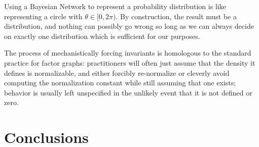 \documentclass{article}
\begin{document}
\begin{vfull}
		Using a Bayesian Network to represent a probability distribution is like representing a circle with $\theta \in [0, 2\pi)$. 
		By construction, the result must be a distribution, and nothing can possibly go wrong so long as we can always decide on exactly one distribution which is sufficient for our purposes.
		
		
		The process of mechanistically forcing invariants is homologous to the standard practice for factor graphs: practitioners will often just assume that the density it defines is normalizable, and either forcibly re-normalize or cleverly avoid computing the normalization constant while still assuming that one exists; behavior is usually left unspecified in the unlikely event that it is not defined or zero.
	\end{vfull}

	\section{Conclusions}
\end{document}
